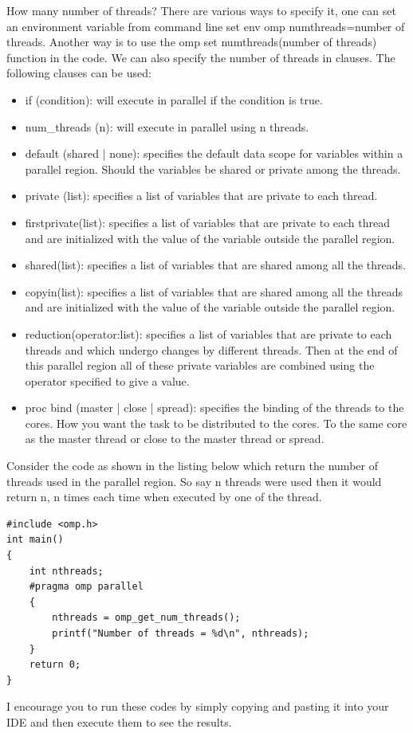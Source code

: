 \documentclass[12pt]{article}
\begin{document}
How many number of threads? There are various ways to specify it, one can set an environment variable from command line set env omp numthreads=number of threads. 
Another way is to use the omp set numthreads(number of threads) function in the code. We can also specify the number of threads in clauses.
The following clauses can be used:
\begin{itemize}
\item if (condition): will execute in parallel if the condition is true.
\item num\_threads (n): will execute in parallel using n threads.
\item default (shared | none): specifies the default data scope for variables within a parallel region. Should the variables be shared or private among the threads.
\item private (list): specifies a list of variables that are private to each thread.
\item firstprivate(list): specifies a list of variables that are private to each thread and are initialized with the value of the variable outside the parallel region.
\item shared(list): specifies a list of variables that are shared among all the threads.
\item copyin(list): specifies a list of variables that are shared among all the threads and are initialized with the value of the variable outside the parallel region.
\item reduction(operator:list): specifies a list of variables that are private to each threads and which undergo changes by different threads. Then at the end of this parallel region all of these private variables are combined using the operator 
specified to give a value.
\item proc bind (master | close | spread): specifies the binding of the threads to the cores. How you want the task to be distributed to the cores. To the same core as the master thread or close to the master thread or spread.
\end{itemize}
Consider the code as shown  in the listing below which return the number of threads used in the parallel region. So say n threads were used then it would return n, n times each time when executed by one of the thread. 
\begin{lstlisting}
#include <omp.h>
int main()
{
    int nthreads;
    #pragma omp parallel
    {
        nthreads = omp_get_num_threads();
        printf("Number of threads = %d\n", nthreads);
    }
    return 0;
}
\end{lstlisting}
I encourage you to run these codes by simply copying and pasting it into your IDE and then execute them to see the results.
\end{document}
